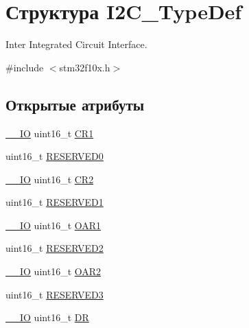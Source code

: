 \hypertarget{struct_i2_c___type_def}{}\section{Структура I2\+C\+\_\+\+Type\+Def}
\label{struct_i2_c___type_def}


Inter Integrated Circuit Interface.  




{\ttfamily \#include $<$stm32f10x.\+h$>$}

\subsection*{Открытые атрибуты}
\begin{DoxyCompactItemize}
\item 
\mbox{\hyperlink{group___c_m_s_i_s___c_m3__core__definitions_gaec43007d9998a0a0e01faede4133d6be}{\+\_\+\+\_\+\+IO}} uint16\+\_\+t \mbox{\hyperlink{struct_i2_c___type_def_ad35ea0b199cefb757de20e9b78168534}{C\+R1}}
\item 
uint16\+\_\+t \mbox{\hyperlink{struct_i2_c___type_def_aee6ec4cf81ee0bb5b038576ba0d738a2}{R\+E\+S\+E\+R\+V\+E\+D0}}
\item 
\mbox{\hyperlink{group___c_m_s_i_s___c_m3__core__definitions_gaec43007d9998a0a0e01faede4133d6be}{\+\_\+\+\_\+\+IO}} uint16\+\_\+t \mbox{\hyperlink{struct_i2_c___type_def_ac8bff45acc455489620d50e697a24c9d}{C\+R2}}
\item 
uint16\+\_\+t \mbox{\hyperlink{struct_i2_c___type_def_a6c3d147223993f2b832b508ee5a5178e}{R\+E\+S\+E\+R\+V\+E\+D1}}
\item 
\mbox{\hyperlink{group___c_m_s_i_s___c_m3__core__definitions_gaec43007d9998a0a0e01faede4133d6be}{\+\_\+\+\_\+\+IO}} uint16\+\_\+t \mbox{\hyperlink{struct_i2_c___type_def_ad218fdcb9606477c1d63f8ee38d3c5c9}{O\+A\+R1}}
\item 
uint16\+\_\+t \mbox{\hyperlink{struct_i2_c___type_def_a5e98c83a176deeb4a8a68f9ca12fdfd2}{R\+E\+S\+E\+R\+V\+E\+D2}}
\item 
\mbox{\hyperlink{group___c_m_s_i_s___c_m3__core__definitions_gaec43007d9998a0a0e01faede4133d6be}{\+\_\+\+\_\+\+IO}} uint16\+\_\+t \mbox{\hyperlink{struct_i2_c___type_def_a03189e2a57c81ae5d103739b72f52c93}{O\+A\+R2}}
\item 
uint16\+\_\+t \mbox{\hyperlink{struct_i2_c___type_def_a355b2c5aa0dd467de1f9dea4a9afe986}{R\+E\+S\+E\+R\+V\+E\+D3}}
\item 
\mbox{\hyperlink{group___c_m_s_i_s___c_m3__core__definitions_gaec43007d9998a0a0e01faede4133d6be}{\+\_\+\+\_\+\+IO}} uint16\+\_\+t \mbox{\hyperlink{struct_i2_c___type_def_a5c1551b886fbb8e801b9203f6d7dc7c5}{DR}}

\end{DoxyCompactItemize}
